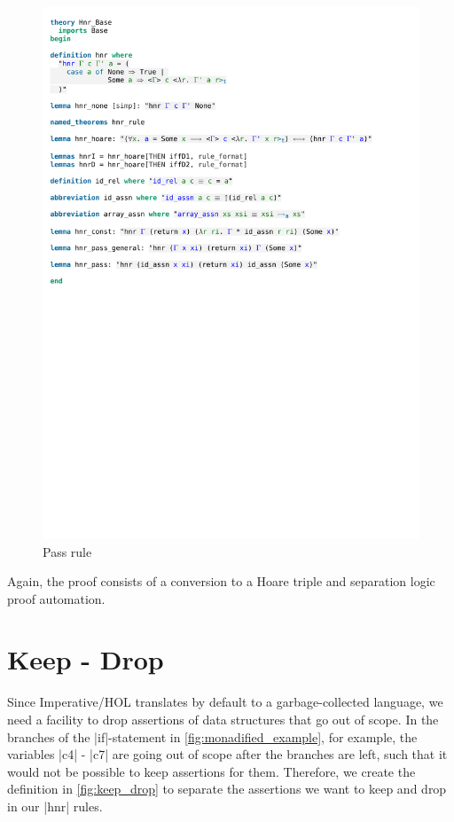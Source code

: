 \begin{figure}[htpb]
    \includegraphics[trim={0 15cm 0 13,2cm}, clip, width=1.00\textwidth]{figures/Theory_Hnr_Base.pdf}
    \caption[Pass rule]{Pass rule}
    \label{fig:hnr_pass}
\end{figure}

\noindent Again, the proof consists of a conversion to a Hoare triple and separation logic proof automation.

\section{Keep - Drop}\label{section:keep_drop}

Since Imperative/HOL translates by default to a garbage-collected language, we need a facility to drop assertions of data structures that go out of scope. In the branches of the |if|-statement in \autoref{fig:monadified_example}, for example, the variables |c4| - |c7| are going out of scope after the branches are left, such that it would not be possible to keep assertions for them. 
Therefore, we create the definition in \autoref{fig:keep_drop} to separate the assertions we want to keep and drop in our |hnr| rules.

